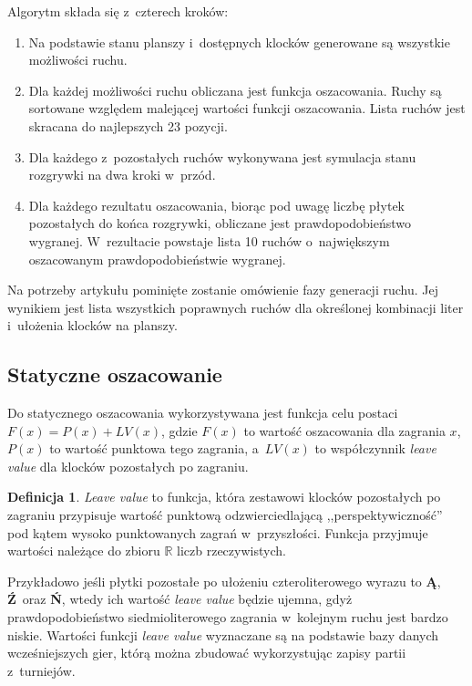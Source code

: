 \documentclass[a4paper,twocolumn,11pt]{article}
\theoremstyle{definition}
\newtheorem{definition}{Definicja}
\begin{document}
Algorytm składa się z~czterech kroków:

\begin{enumerate}
	\item Na podstawie stanu planszy i~dostępnych klocków generowane są wszystkie możliwości ruchu.
	\item Dla każdej możliwości ruchu obliczana jest funkcja oszacowania. Ruchy są sortowane względem malejącej wartości funkcji oszacowania. Lista ruchów jest skracana do najlepszych 23 pozycji.
	\item Dla każdego z~pozostałych ruchów wykonywana jest symulacja stanu rozgrywki na dwa kroki w~przód.
	\item Dla każdego rezultatu oszacowania, biorąc pod uwagę liczbę płytek pozostałych do końca rozgrywki, obliczane jest prawdopodobieństwo wygranej. W~rezultacie powstaje lista 10 ruchów o~największym oszacowanym prawdopodobieństwie wygranej.
\end{enumerate}

Na potrzeby artykułu pominięte zostanie omówienie fazy generacji ruchu. Jej wynikiem jest lista wszystkich poprawnych ruchów dla określonej kombinacji liter i~ułożenia klocków na planszy.

\subsection{Statyczne oszacowanie}

Do statycznego oszacowania wykorzystywana jest funkcja celu postaci $F(x) = P(x) + LV(x)$, gdzie $F(x)$ to wartość oszacowania dla zagrania $x$, $P(x)$ to wartość punktowa tego zagrania, a~$LV(x)$ to współczynnik \emph{leave value} dla klocków pozostałych po zagraniu.

\begin{definition}
	\emph{Leave value} to funkcja, która zestawowi klocków pozostałych po zagraniu przypisuje wartość punktową odzwierciedlającą ,,perspektywiczność'' pod kątem wysoko punktowanych zagrań w~przyszłości. Funkcja przyjmuje wartości należące do zbioru $\mathbb{R}$ liczb rzeczywistych.
\end{definition}

Przykładowo jeśli płytki pozostałe po ułożeniu czteroliterowego wyrazu to \textbf{Ą}, \textbf{Ź}~oraz \textbf{Ń}, wtedy ich wartość \emph{leave value} będzie ujemna, gdyż prawdopodobieństwo siedmioliterowego zagrania w~kolejnym ruchu jest bardzo niskie. Wartości funkcji \emph{leave value} wyznaczane są na podstawie bazy danych wcześniejszych gier, którą można zbudować wykorzystując zapisy partii z~turniejów.
\end{document}
